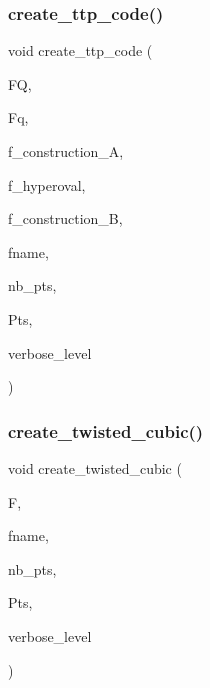 \subsubsection{\texorpdfstring{create\+\_\+ttp\+\_\+code()}{create\_ttp\_code()}}
{\footnotesize\ttfamily void create\+\_\+ttp\+\_\+code (\begin{DoxyParamCaption}\item[{\mbox{\hyperlink{classfinite__field}{finite\+\_\+field}} $\ast$}]{FQ,  }\item[{\mbox{\hyperlink{classfinite__field}{finite\+\_\+field}} $\ast$}]{Fq,  }\item[{\mbox{\hyperlink{galois_8h_a09fddde158a3a20bd2dcadb609de11dc}{I\+NT}}}]{f\+\_\+construction\+\_\+A,  }\item[{\mbox{\hyperlink{galois_8h_a09fddde158a3a20bd2dcadb609de11dc}{I\+NT}}}]{f\+\_\+hyperoval,  }\item[{\mbox{\hyperlink{galois_8h_a09fddde158a3a20bd2dcadb609de11dc}{I\+NT}}}]{f\+\_\+construction\+\_\+B,  }\item[{\mbox{\hyperlink{galois_8h_ab6cc7b4aeb6ea31aba2b3fbfc83ff5e6}{B\+Y\+TE}} $\ast$}]{fname,  }\item[{\mbox{\hyperlink{galois_8h_a09fddde158a3a20bd2dcadb609de11dc}{I\+NT}} \&}]{nb\+\_\+pts,  }\item[{\mbox{\hyperlink{galois_8h_a09fddde158a3a20bd2dcadb609de11dc}{I\+NT}} $\ast$\&}]{Pts,  }\item[{\mbox{\hyperlink{galois_8h_a09fddde158a3a20bd2dcadb609de11dc}{I\+NT}}}]{verbose\+\_\+level }\end{DoxyParamCaption})}

\mbox{\label{geometric__object_8_c_a5028ae35a2f498f86589823f943c267f}} 
\subsubsection{\texorpdfstring{create\+\_\+twisted\+\_\+cubic()}{create\_twisted\_cubic()}}
{\footnotesize\ttfamily void create\+\_\+twisted\+\_\+cubic (\begin{DoxyParamCaption}\item[{\mbox{\hyperlink{classfinite__field}{finite\+\_\+field}} $\ast$}]{F,  }\item[{\mbox{\hyperlink{galois_8h_ab6cc7b4aeb6ea31aba2b3fbfc83ff5e6}{B\+Y\+TE}} $\ast$}]{fname,  }\item[{\mbox{\hyperlink{galois_8h_a09fddde158a3a20bd2dcadb609de11dc}{I\+NT}} \&}]{nb\+\_\+pts,  }\item[{\mbox{\hyperlink{galois_8h_a09fddde158a3a20bd2dcadb609de11dc}{I\+NT}} $\ast$\&}]{Pts,  }\item[{\mbox{\hyperlink{galois_8h_a09fddde158a3a20bd2dcadb609de11dc}{I\+NT}}}]{verbose\+\_\+level }\end{DoxyParamCaption})}

